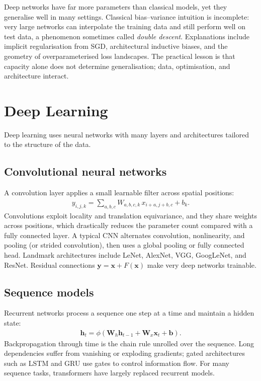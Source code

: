 \documentclass[a4paper, 12pt]{book}
\begin{document}
Deep networks have far more parameters than classical models, yet they generalise well
in many settings. Classical bias--variance intuition is incomplete: very large
networks can interpolate the training data and still perform well on test data, a
phenomenon sometimes called \emph{double descent}. Explanations include implicit
regularisation from SGD, architectural inductive biases, and the geometry of
overparameterised loss landscapes. The practical lesson is that capacity alone does
not determine generalisation; data, optimisation, and architecture interact.


\chapter{Deep Learning}
\label{ch:deep}

Deep learning uses neural networks with many layers and architectures tailored to the
structure of the data.

\section{Convolutional neural networks}

A convolution layer applies a small learnable filter across spatial positions:
\begin{align}
    y_{i,j,k} = \sum_{a,b,c} W_{a,b,c,k}\,x_{i+a,j+b,c} + b_k.
\end{align}
Convolutions exploit locality and translation equivariance, and they share weights
across positions, which drastically reduces the parameter count compared with a fully
connected layer. A typical CNN alternates convolution, nonlinearity, and pooling
(or strided convolution), then uses a global pooling or fully connected head.
Landmark architectures include LeNet, AlexNet, VGG, GoogLeNet, and ResNet. Residual
connections $\mathbf{y}=\mathbf{x}+F(\mathbf{x})$ make very deep networks trainable.

\section{Sequence models}

Recurrent networks process a sequence one step at a time and maintain a hidden state:
\begin{align}
    \mathbf{h}_t = \phi(\mathbf{W}_h\mathbf{h}_{t-1}+\mathbf{W}_x\mathbf{x}_t+\mathbf{b}).
\end{align}
Backpropagation through time is the chain rule unrolled over the sequence. Long
dependencies suffer from vanishing or exploding gradients; gated architectures such as
LSTM and GRU use gates to control information flow. For many sequence tasks,
transformers have largely replaced recurrent models.
\end{document}
